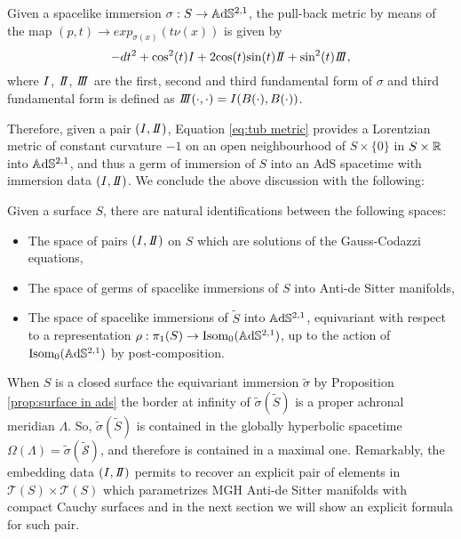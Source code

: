 \begin{corollary}
    Given a spacelike immersion $\sigma:S\to \mathbb{A}\mathrm{d}\mathbb{S}^{2,1}$, the pull-back metric by means of the map $(p,t) \to exp_{\sigma(x)}(t\nu(x))$ is given by
    \begin{equation}\label{eq:tub metric}
        -dt^2 + \text{cos}^2(t)\I + 2\text{cos}(t)\text{sin}(t)\II + \text{sin}^2(t)\III,
    \end{equation}
    where $I$, $\II$, $\III$ are the first, second and third fundamental form of $\sigma$ and third fundamental form is defined as $\III(\cdot,\cdot)=\I(B(\cdot),B(\cdot))$.
\end{corollary}
Therefore, given a pair $(\I,\II)$, Equation \ref{eq:tub metric} provides a Lorentzian metric of constant curvature $-1$ on an open neighbourhood of $S \times\{0\}$ in $S\times\mathbb{R}$ into $\mathbb{A}\mathrm{d}\mathbb{S}^{2,1}$, and thus a germ of immersion of $S$ into an AdS spacetime with immersion data $(\I,\II)$. We conclude the above discussion with the following:
\begin{proposition}\label{thm:immersion data classification}
    Given a surface $S$, there are natural identifications between the following spaces:
    \begin{itemize}
        \item The space of pairs $(\I,\II)$ on $S$ which are solutions of the Gauss-Codazzi equations,
        \item The space of germs of spacelike immersions of $S$ into Anti-de Sitter manifolds,
        \item The space of spacelike immersions of $\widetilde{S}$ into $\mathbb{A}\mathrm{d}\mathbb{S}^{2,1}$, equivariant with respect to a representation $\rho:\pi_1(S) \to \text{Isom}_0(\mathbb{A}\mathrm{d}\mathbb{S}^{2,1})$, up to the action of $\text{Isom}_0(\mathbb{A}\mathrm{d}\mathbb{S}^{2,1})$ by post-composition.
    \end{itemize}
\end{proposition}
\noindent When $S$ is a closed surface the equivariant immersion $\widetilde{\sigma}$  by Proposition \ref{prop:surface in ads} the border at infinity of $\widetilde{\sigma}(\widetilde{S})$ is a proper achronal meridian $\Lambda$. So, $ \widetilde{\sigma}(\widetilde{S})$ is contained in the globally hyperbolic spacetime $\Omega(\Lambda)= \mathcal{\widetilde{\sigma}(\widetilde{S})}$, and therefore is contained in a maximal one.
Remarkably, the embedding data $(\I,\II)$ permits to recover an explicit pair of elements in $\mathcal{T}(S)\times\mathcal{T}(S)$ which parametrizes MGH Anti-de Sitter manifolds with compact Cauchy surfaces and in the next section we will show an explicit formula for such pair.

